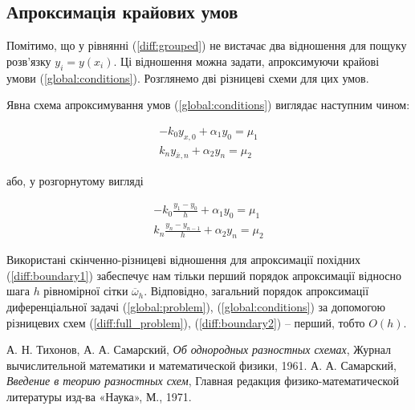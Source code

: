 \subsection{Апроксимація крайових умов}

Помітимо, що у рівнянні (\ref{diff:grouped}) не вистачає два відношення для пощуку розв'язку \( y_i = y(x_i)\). Ці відношення можна задати, апроксимуючи крайові умови (\ref{global:conditions}). Розглянемо дві різницеві схеми для цих умов.

\bigskip

Явна схема апроксимування умов (\ref{global:conditions}) виглядає наступним чином:

\begin{equation}
\begin{split} \label{diff:boundary1}
-k_0 y_{x,0} + \alpha_1 y_0 = \mu_1 \\
k_n y_{\overline{x}, n} + \alpha_2 y_n = \mu_2
\end{split}
\end{equation}

або, у розгорнутому вигляді

\begin{equation}
\begin{split} \label{diff:boundary2}
-k_0 \frac{y_1 - y_0}{h} + \alpha_1 y_0 = \mu_1 \\
k_n \frac{y_n - y_{n-1}}{h} + \alpha_2 y_n = \mu_2
\end{split}
\end{equation}

Використані скінченно-різницеві відношення для апроксимації похідних (\ref{diff:boundary1}) забеспечує нам тільки перший порядок апроксимації відносно шага \(h\) рівномірної сітки \(\overline{\omega}_h\). Відповідно, загальний порядок апроксимації диференціальної задачі (\ref{global:problem}), (\ref{global:conditions}) за допомогою різницевих схем (\ref{diff:full_problem}), (\ref{diff:boundary2}) -- перший, тобто \(O(h)\).

\begin{thebibliography}{9}

  А. Н. Тихонов, А. А. Самарский,
  \emph{Об однородных разностных схемах},
  Журнал вычислительной математики и математической физики, 1961.
  А. А. Самарский,
  \emph{Введение в теорию разностных схем},
  Главная редакция физико-математической литературы изд-ва «Наука», 
  М., 1971. 


\end{thebibliography}
